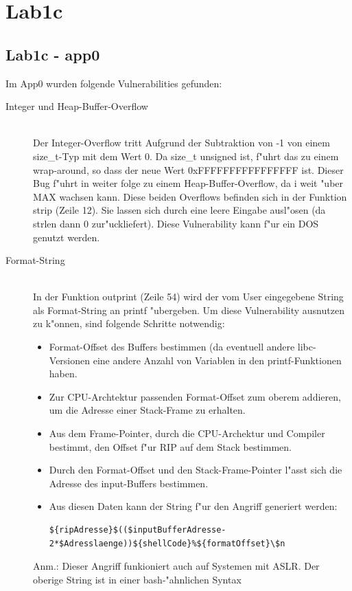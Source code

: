 \documentclass[12pt,a4paper,titlepage,oneside]{scrartcl}
\begin{document}
\section{Lab1c} 
\subsection{Lab1c - app0}
Im App0 wurden folgende Vulnerabilities gefunden:
\begin{description}
  \item[Integer und Heap-Buffer-Overflow] \hfill \\
    Der Integer-Overflow tritt Aufgrund der Subtraktion von -1 von einem size\_t-Typ mit dem Wert 0. Da size\_t unsigned ist, f"uhrt das zu einem wrap-around, so dass der neue Wert 0xFFFFFFFFFFFFFFFF ist. \newline
    Dieser Bug f"uhrt in weiter folge zu einem Heap-Buffer-Overflow, da i weit "uber MAX wachsen kann.\newline
    Diese beiden Overflows befinden sich in der Funktion strip (Zeile 12). Sie lassen sich durch eine leere Eingabe ausl"osen (da strlen dann 0 zur"uckliefert).
    Diese Vulnerability kann f"ur ein DOS genutzt werden.
    
  \item[Format-String] \hfill \\
  In der Funktion outprint (Zeile 54) wird der vom User eingegebene String als Format-String an printf "ubergeben.
    Um diese Vulnerability ausnutzen zu k"onnen, sind folgende Schritte notwendig:
    \begin{itemize}
        \item Format-Offset des Buffers bestimmen (da eventuell andere libc-Versionen eine andere Anzahl von Variablen in den printf-Funktionen haben.
        \item Zur CPU-Archtektur passenden Format-Offset zum oberem addieren, um die Adresse einer Stack-Frame zu erhalten.
        \item Aus dem Frame-Pointer, durch die CPU-Archektur und Compiler bestimmt, den Offset f"ur RIP auf dem Stack bestimmen.
        \item Durch den Format-Offset und den Stack-Frame-Pointer l"asst sich die Adresse des input-Buffers bestimmen.
        \item Aus diesen Daten kann der String f"ur den Angriff generiert werden:\\
        \begin{lstlisting}
${ripAdresse}$(($inputBufferAdresse-2*$Adresslaenge))${shellCode}%${formatOffset}\$n
        \end{lstlisting}
    \end{itemize}
    Anm.: Dieser Angriff funkioniert auch auf Systemen mit ASLR. Der oberige String ist in einer bash-"ahnlichen Syntax
    

\end{description}
\end{document}
